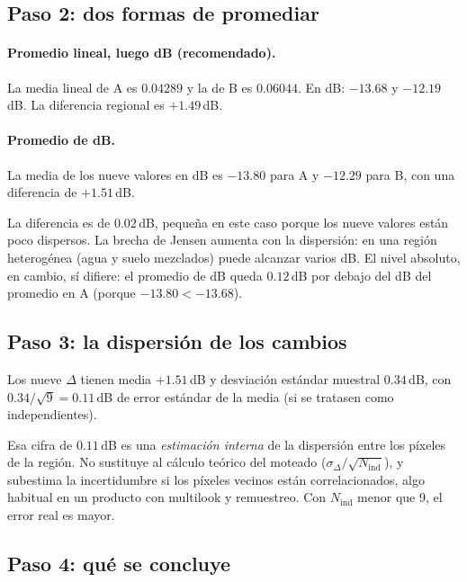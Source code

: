 \documentclass[11pt,a4paper]{article}
\begin{document}
\subsection{Paso 2: dos formas de promediar}

\paragraph{Promedio lineal, luego dB (recomendado).} La media lineal de A es $0.04289$ y la de B es $0.06044$.
En dB: $-13.68$ y $-12.19$\,dB. La diferencia regional es $+1.49$\,dB.

\paragraph{Promedio de dB.} La media de los nueve valores en dB es $-13.80$ para A y $-12.29$ para B, con una
diferencia de $+1.51$\,dB.

La diferencia es de $0.02$\,dB, pequeña en este caso porque los nueve valores están poco dispersos. La
brecha de Jensen aumenta con la dispersión: en una región heterogénea (agua y suelo mezclados) puede alcanzar varios dB.
El nivel absoluto, en cambio, sí difiere: el promedio de dB queda $0.12$\,dB por debajo del dB del promedio en A
(porque $-13.80<-13.68$).

\subsection{Paso 3: la dispersión de los cambios}

Los nueve $\Delta$ tienen media $+1.51$\,dB y desviación estándar muestral $0.34$\,dB, con
$0.34/\sqrt9=0.11$\,dB de error estándar de la media (si se tratasen como independientes).

\begin{cuidado}
Esa cifra de $0.11$\,dB es una \emph{estimación interna} de la dispersión entre los píxeles de la región.
No sustituye al cálculo teórico del moteado ($\sigma_\Delta/\sqrt{N_{\mathrm{ind}}}$), y subestima la
incertidumbre si los píxeles vecinos están correlacionados, algo habitual en un producto con multilook y
remuestreo. Con $N_{\mathrm{ind}}$ menor que 9, el error real es mayor.
\end{cuidado}

\subsection{Paso 4: qué se concluye}
\end{document}
